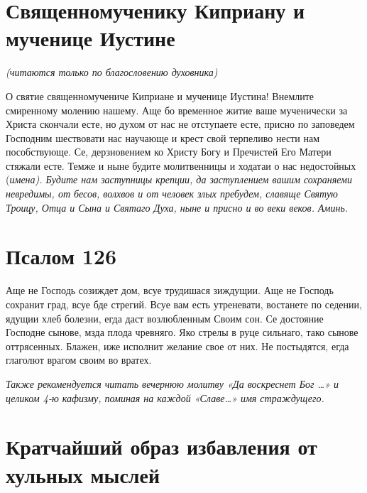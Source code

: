 \section{Священномученику Киприану и мученице Иустине}
 


\itshape (читаются только по благословению духовника)\normalfont{}




 О святие священномучениче Киприане и мученице Иустина! Внемлите смиренному молению нашему. Аще бо временное житие ваше мученически за Христа скончали есте, но духом от нас не отступаете есте, присно по заповедем Господним шествовати нас научающе и крест свой терпеливо нести нам пособствующе. Се, дерзновением ко Христу Богу и Пречистей Его Матери стяжали есте. Темже и ныне будите молитвенницы и ходатаи о нас недостойных (\itshape имена\normalfont{}). Будите нам заступницы крепции, да заступлением вашим сохраняеми невредимы, от бесов, волхвов и от человек злых пребудем, славяще Святую Троицу, Отца и Сына и Святаго Духа, ныне и присно и во веки веков. Аминь.


\section{Псалом 126}
 


Аще не Господь созиждет дом, всуе трудишася зиждущии. Аще не Господь сохранит град, всуе бде стрегий. Всуе вам есть утреневати, востанете по седении, ядущии хлеб болезни, егда даст возлюбленным Своим сон. Се достояние Господне сынове, мзда плода чревняго. Яко стрелы в руце сильнаго, тако сынове оттрясенных. Блажен, иже исполнит желание свое от них. Не постыдятся, егда глаголют врагом своим во вратех.

\itshape Также рекомендуется читать вечернюю молитву  «Да воскреснет Бог …» и целиком 4-ю кафизму, поминая на каждой «Славе…» имя страждущего.

\normalfont{} 
\mychapterending


 

\section{Кратчайший образ избавления от хульных мыслей}
 




